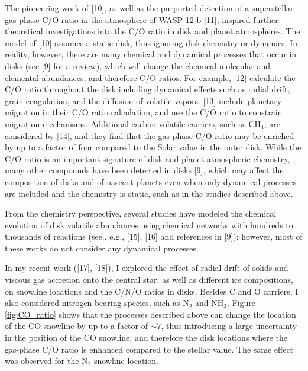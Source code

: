 \documentclass[12pt, letterpaper]{article}
\begin{document}
The pioneering work of [10], as well as the purported detection of a superstellar gas-phase C/O ratio in the atmosphere of WASP 12-b [11], inspired further theoretical investigations into the C/O ratio in disk and planet atmospheres. The model of [10] assumes a static disk, thus ignoring disk chemistry or dynamics. In reality, however, there are many chemical and dynamical processes that occur in disks (see [9] for a review), which will change the chemical molecular and elemental abundances, and therefore C/O ratios. For example, [12] calculate the C/O ratio throughout the disk including dynamical effects such as radial drift, grain coagulation, and the diffusion of volatile vapors. [13] include planetary migration in their C/O ratio calculation, and use the C/O ratio to constrain migration mechanisms. Additional carbon volatile carriers, such as CH$_4$, are considered by [14],  and they find that the gas-phase C/O ratio may be enriched by up to a factor of four compared to the Solar value in the outer disk.  While the C/O ratio is an important signature of disk and planet atmospheric chemistry, many other compounds have been detected in disks [9], which may affect the composition of disks and of nascent planets even when only dynamical processes are included and the chemistry is static, such as in the studies described above. 

From the chemistry perspective, several studies have modeled the chemical evolution of disk volatile abundances using chemical networks with hundreds to thousands of reactions (see., e.g., [15], [16] and references in [9]); however, most of these works do not consider any dynamical processes.   

In my recent work ([17], [18]), I explored the effect of radial drift of solids and viscous gas accretion onto the central star, as well as different ice compositions, on snowline locations and the C/N/O ratios in disks. Besides C and O carriers, I also considered nitrogen-bearing species, such as N$_2$ and NH$_3$. Figure \ref{fig:CO_ratio} shows that the processes described above can change the location of the CO snowline by up to a factor of $\sim$7, thus introducing a large uncertainty in the position of the CO snowline, and therefore the disk locations where the gas-phase C/O ratio is enhanced compared to the stellar value. The same effect was observed for the N$_2$ snowline location.
\end{document}
